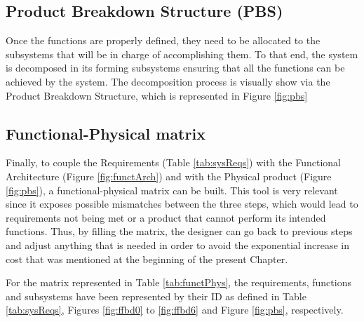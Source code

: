 \subsection{Product Breakdown Structure (PBS)}

Once the functions are properly defined, they need to be allocated to the subsystems that will be in charge of accomplishing them.
To that end, the system is decomposed in its forming subsystems ensuring that all the functions can be achieved by the system.
The decomposition process is visually show via the Product Breakdown Structure, which is represented in Figure \ref{fig:pbs}




\subsection{Functional-Physical matrix}

Finally, to couple the Requirements (Table \ref{tab:sysReqs}) with the Functional Architecture (Figure \ref{fig:functArch}) and with the Physical product (Figure \ref{fig:pbs}), a functional-physical matrix can be built.
This tool is very relevant since it exposes possible mismatches between the three steps, which would lead to requirements not being met or a product that cannot perform its intended functions.
Thus, by filling the matrix, the designer can go back to previous steps and adjust anything that is needed in order to avoid the exponential increase in cost that was mentioned at the beginning of the present Chapter.

For the matrix represented in Table \ref{tab:functPhys}, the requirements, functions and subsystems have been represented by their ID as defined in Table \ref{tab:sysReqs}, Figures \ref{fig:ffbd0} to \ref{fig:ffbd6} and Figure \ref{fig:pbs}, respectively.






